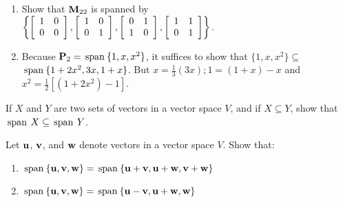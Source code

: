 \begin{multicols}{2}
\begin{ex}
\begin{enumerate}[label={\alph*.}]
\item Show that $\textbf{M}_{22}$ is spanned by \\
\hspace*{-1em}$
\left\{
\left[ \begin{array}{rr}
1 & 0 \\
0 &  0
\end{array} \right]
, 
\left[ \begin{array}{rr}
1 & 0 \\
0 & 1
\end{array} \right]
, 
\left[ \begin{array}{rr}
0 & 1 \\
1 & 0
\end{array} \right]
, 
\left[ \begin{array}{rrr}
1 & 1 \\
0 & 1
\end{array} \right]
\right\}
$.
\end{enumerate}
\begin{sol}
\begin{enumerate}[label={\alph*.}]
\setcounter{enumi}{1}
\item  Because $\textbf{P}_{2} = \thinspace\operatorname{span\medspace}\{1, x, x^{2}\}$, it suffices to show that $\{1, x, x^{2}\} \subseteq$
 $\thinspace\operatorname{span\medspace}\{1 + 2x^{2}, 3x, 1 + x\}$. But $x = \frac{1}{3}(3x); 1 = (1 + x) - x$ and $x^{2} = \frac{1}{2}[(1 + 2x^{2}) - 1]$.

\end{enumerate}
\end{sol}
\end{ex}

\begin{ex}
If $X$ and $Y$ are two sets of vectors in a vector space $V$, and if $X \subseteq Y$, show that \newline $\thinspace\operatorname{span\medspace} X \subseteq \thinspace\operatorname{span\medspace} Y$.
\end{ex}

\begin{ex}
Let $\textbf{u}$, $\textbf{v}$, and $\textbf{w}$ denote vectors in a vector space $V$. Show that:

\begin{enumerate}[label={\alph*.}]
\item $\thinspace\operatorname{span\medspace}\{\textbf{u}, \textbf{v}, \textbf{w}\} = \thinspace\operatorname{span\medspace}\{\textbf{u} + \textbf{v}, \textbf{u} + \textbf{w}, \textbf{v} + \textbf{w}\}$

\item $\thinspace\operatorname{span\medspace}\{\textbf{u}, \textbf{v}, \textbf{w}\} = \thinspace\operatorname{span\medspace}\{\textbf{u} - \textbf{v}, \textbf{u} + \textbf{w}, \textbf{w}\}$


\end{enumerate}
\end{ex}
\end{multicols}
